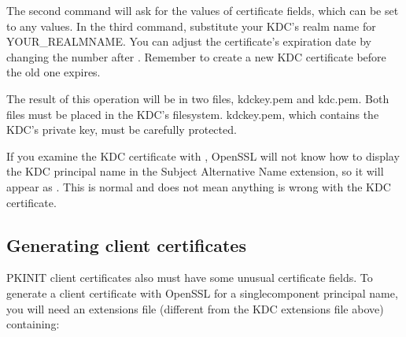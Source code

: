 \documentclass[letterpaper,10pt,english]{sphinxmanual}
\begin{document}
\begin{sphinxVerbatim}[commandchars=\\\{\}]
    
      
       \PYGZbs{}
            \PYGZbs{}
        
 
\end{sphinxVerbatim}

\sphinxAtStartPar
The second command will ask for the values of certificate fields,
which can be set to any values.  In the third command, substitute your
KDC’s realm name for YOUR\_REALMNAME.  You can adjust the certificate’s
expiration date by changing the number after .  Remember to
create a new KDC certificate before the old one expires.

\sphinxAtStartPar
The result of this operation will be in two files, kdckey.pem and
kdc.pem.  Both files must be placed in the KDC’s filesystem.
kdckey.pem, which contains the KDC’s private key, must be carefully
protected.

\sphinxAtStartPar
If you examine the KDC certificate with , OpenSSL will not know how to display the KDC principal
name in the Subject Alternative Name extension, so it will appear as
.  This is normal and does not mean
anything is wrong with the KDC certificate.


\subsection{Generating client certificates}
\label{\detokenize{admin/pkinit:generating-client-certificates}}
\sphinxAtStartPar
PKINIT client certificates also must have some unusual certificate
fields.  To generate a client certificate with OpenSSL for a
single\sphinxhyphen{}component principal name, you will need an extensions file
(different from the KDC extensions file above) containing:
\end{document}

